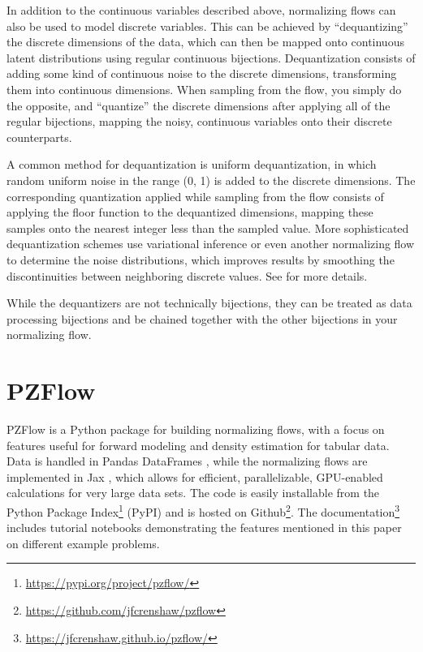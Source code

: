 \documentclass[twocolumn,twocolappendix]{aastex631}
\begin{document}
In addition to the continuous variables described above, normalizing flows can also be used to model discrete variables.
This can be achieved by ``dequantizing'' the discrete dimensions of the data, which can then be mapped onto continuous latent distributions using regular continuous bijections.
Dequantization consists of adding some kind of continuous noise to the discrete dimensions, transforming them into continuous dimensions.
When sampling from the flow, you simply do the opposite, and ``quantize'' the discrete dimensions after applying all of the regular bijections, mapping the noisy, continuous variables onto their discrete counterparts.

A common method for dequantization is uniform dequantization, in which random uniform noise in the range (0, 1) is added to the discrete dimensions.
The corresponding quantization applied while sampling from the flow consists of applying the floor function to the dequantized dimensions, mapping these samples onto the nearest integer less than the sampled value.
More sophisticated dequantization schemes use variational inference or even another normalizing flow to determine the noise distributions, which improves results by smoothing the discontinuities between neighboring discrete values.
See \citet{ho2019} \citet{hoogeboom2020} for more details.

While the dequantizers are not technically bijections, they can be treated as data processing bijections and be chained together with the other bijections in your normalizing flow.


\section{PZFlow}
\label{sec:pzflow}

PZFlow is a Python package for building normalizing flows, with a focus on features useful for forward modeling and density estimation for tabular data.
Data is handled in Pandas DataFrames \citep{pandas}, while the normalizing flows are implemented in Jax \citep{jax}, which allows for efficient, parallelizable, GPU-enabled calculations for very large data sets.
The code is easily installable from the Python Package Index\footnote{\url{https://pypi.org/project/pzflow/}} (PyPI) and is hosted on Github\footnote{\url{https://github.com/jfcrenshaw/pzflow}}.
The documentation\footnote{\url{https://jfcrenshaw.github.io/pzflow/}} includes tutorial notebooks demonstrating the features mentioned in this paper on different example problems.
\end{document}
